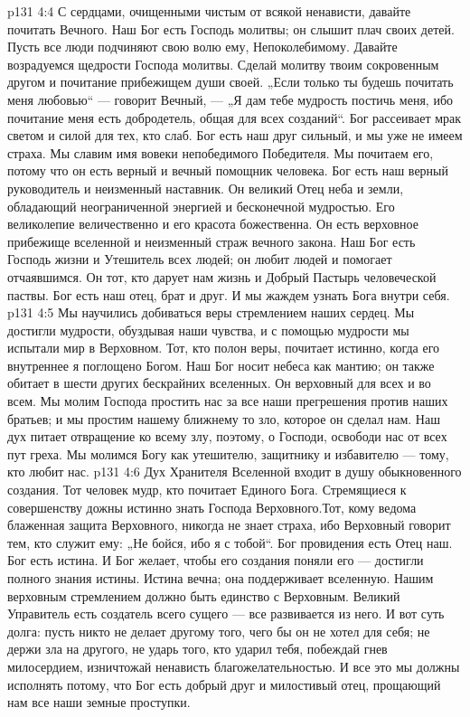 \vs p131 4:4 С сердцами, очищенными чистым от всякой ненависти, давайте почитать Вечного. Наш Бог есть Господь молитвы; он слышит плач своих детей. Пусть все люди подчиняют свою волю ему, Непоколебимому. Давайте возрадуемся щедрости Господа молитвы. Сделай молитву твоим сокровенным другом и почитание прибежищем души своей. „Если только ты будешь почитать меня любовью“ --- говорит Вечный, --- „Я дам тебе мудрость постичь меня, ибо почитание меня есть добродетель, общая для всех созданий“. Бог рассеивает мрак светом и силой для тех, кто слаб. Бог есть наш друг сильный, и мы уже не имеем страха. Мы славим имя вовеки непобедимого Победителя. Мы почитаем его, потому что он есть верный и вечный помощник человека. Бог есть наш верный руководитель и неизменный наставник. Он великий Отец неба и земли, обладающий неограниченной энергией и бесконечной мудростью. Его великолепие величественно и его красота божественна. Он есть верховное прибежище вселенной и неизменный страж вечного закона. Наш Бог есть Господь жизни и Утешитель всех людей; он любит людей и помогает отчаявшимся. Он тот, кто дарует нам жизнь и Добрый Пастырь человеческой паствы. Бог есть наш отец, брат и друг. И мы жаждем узнать Бога внутри себя.
\vs p131 4:5 Мы научились добиваться веры стремлением наших сердец. Мы достигли мудрости, обуздывая наши чувства, и с помощью мудрости мы испытали мир в Верховном. Тот, кто полон веры, почитает истинно, когда его внутреннее я поглощено Богом. Наш Бог носит небеса как мантию; он также обитает в шести других бескрайних вселенных. Он верховный для всех и во всем. Мы молим Господа простить нас за все наши прегрешения против наших братьев; и мы простим нашему ближнему то зло, которое он сделал нам. Наш дух питает отвращение ко всему злу, поэтому, о Господи, освободи нас от всех пут греха. Мы молимся Богу как утешителю, защитнику и избавителю --- тому, кто любит нас.
\vs p131 4:6 Дух Хранителя Вселенной входит в душу обыкновенного создания. Тот человек мудр, кто почитает Единого Бога. Стремящиеся к совершенству дожны истинно знать Господа Верховного.Тот, кому ведома блаженная защита Верховного, никогда не знает страха, ибо Верховный говорит тем, кто служит ему: „Не бойся, ибо я с тобой“. Бог провидения есть Отец наш. Бог есть истина. И Бог желает, чтобы его создания поняли его --- достигли полного знания истины. Истина вечна; она поддерживает вселенную. Нашим верховным стремлением должно быть единство с Верховным. Великий Управитель есть создатель всего сущего --- все развивается из него. И вот суть долга: пусть никто не делает другому того, чего бы он не хотел для себя; не держи зла на другого, не ударь того, кто ударил тебя, побеждай гнев милосердием, изничтожай ненависть благожелательностью. И все это мы должны исполнять потому, что Бог есть добрый друг и милостивый отец, прощающий нам все наши земные проступки.
